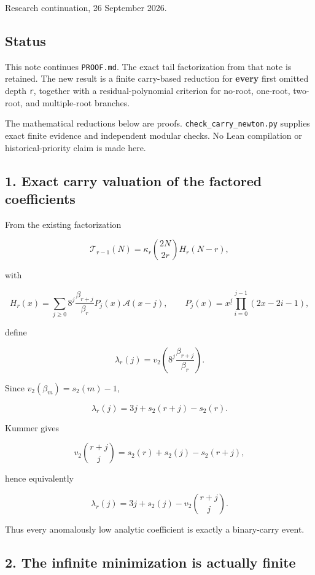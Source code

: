 \documentclass[11pt,letterpaper]{article}
\begin{document}
Research continuation, 26 September 2026.

\subsection{Status}\label{status}

This note continues \texttt{PROOF.md}. The exact tail factorization from that note is retained. The new result is a finite carry-based reduction for \textbf{every} first omitted depth \texttt{r}, together with a residual-polynomial criterion for no-root, one-root, two-root, and multiple-root branches.

The mathematical reductions below are proofs. \texttt{check\_carry\_newton.py} supplies exact finite evidence and independent modular checks. No Lean compilation or historical-priority claim is made here.

\subsection{1. Exact carry valuation of the factored coefficients}\label{exact-carry-valuation-of-the-factored-coefficients}

From the existing factorization

\[
\mathcal T_{r-1}(N)=\kappa_r\binom{2N}{2r}H_r(N-r),
\]

with

\[
H_r(x)=\sum_{j\ge0}8^j\frac{\beta_{r+j}}{\beta_r}P_j(x)\mathscr A(x-j),
\qquad
P_j(x)=x^{\underline j}\prod_{i=0}^{j-1}(2x-2i-1),
\]

define

\[
\lambda_r(j)=v_2\!\left(8^j\frac{\beta_{r+j}}{\beta_r}\right).
\]

Since \(v_2(\beta_m)=s_2(m)-1\),

\[
\boxed{\lambda_r(j)=3j+s_2(r+j)-s_2(r).}
\]

Kummer gives

\[
v_2\binom{r+j}{j}=s_2(r)+s_2(j)-s_2(r+j),
\]

hence equivalently

\[
\boxed{
\lambda_r(j)=3j+s_2(j)-v_2\binom{r+j}{j}.
}
\]

Thus every anomalously low analytic coefficient is exactly a binary-carry event.

\subsection{2. The infinite minimization is actually finite}\label{the-infinite-minimization-is-actually-finite}
\end{document}

